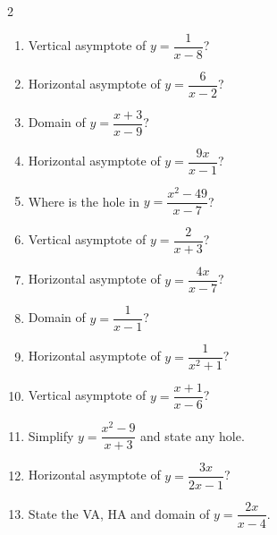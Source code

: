 \documentclass[11pt]{article}
\begin{document}
\clearpage
{}

\begin{recapbox}
\begin{multicols}{2}
\small
\begin{enumerate}[leftmargin=*,itemsep=3pt]
  \item Vertical asymptote of $y=\dfrac{1}{x-8}$?
  \item Horizontal asymptote of $y=\dfrac{6}{x-2}$?
  \item Domain of $y=\dfrac{x+3}{x-9}$?
  \item Horizontal asymptote of $y=\dfrac{9x}{x-1}$?
  \item Where is the hole in $y=\dfrac{x^2-49}{x-7}$?
  \item Vertical asymptote of $y=\dfrac{2}{x+3}$?
  \item Horizontal asymptote of $y=\dfrac{4x}{x-7}$?
  \item Domain of $y=\dfrac{1}{x-1}$?
  \item Horizontal asymptote of $y=\dfrac{1}{x^2+1}$?
  \item Vertical asymptote of $y=\dfrac{x+1}{x-6}$?
  \item Simplify $y=\dfrac{x^2-9}{x+3}$ and state any hole.
  \item Horizontal asymptote of $y=\dfrac{3x}{2x-1}$?
  \item State the VA, HA and domain of $y=\dfrac{2x}{x-4}$.
\end{enumerate}
\end{multicols}
\end{recapbox}
\end{document}
